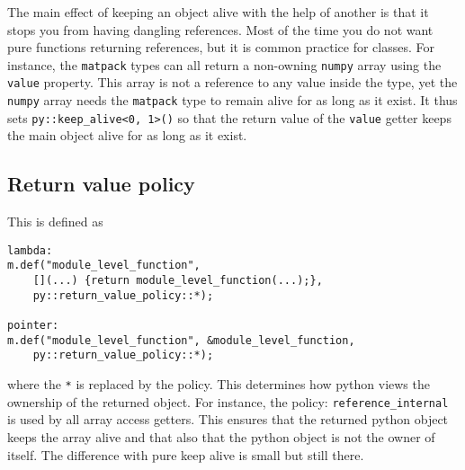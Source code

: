 The main effect of keeping an object alive with the help of another is that it stops you from having dangling references.
Most of the time you do not want pure functions returning references, but it is common practice for classes.  For instance,
the \verb|matpack| types can all return a non-owning \verb|numpy| array using the \verb|value| property.  This array is not
a reference to any value inside the type, yet the \verb|numpy| array needs the \verb|matpack| type to remain alive for as long
as it exist.  It thus sets \verb|py::keep_alive<0, 1>()| so that the return value of the \verb|value| getter keeps the main
object alive for as long as it exist.

\subsection{Return value policy}
This is defined as 
\begin{verbatim}
lambda:
m.def("module_level_function",
    [](...) {return module_level_function(...);},
    py::return_value_policy::*);

pointer:
m.def("module_level_function", &module_level_function,
    py::return_value_policy::*);
\end{verbatim}
where the \verb|*| is replaced by the policy.  This determines how python views the ownership of the returned object.  For instance,
the policy: \verb|reference_internal| is used by all array access getters. This ensures that the returned python object keeps the
array alive and that also that the python object is not the owner of itself.  The difference with pure keep alive is small but still there.

